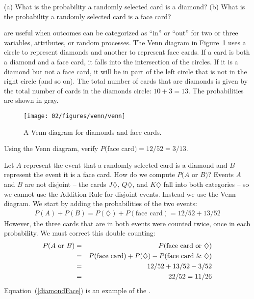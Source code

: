 \begin{exercise}
(a) What is the probability a randomly selected card is a diamond? (b) What is the probability a randomly selected card is a face card?
\end{exercise}

 are useful when outcomes can be categorized as ``in'' or ``out'' for two or three variables, attributes, or random processes. The Venn diagram in Figure~\ref{venn} uses a circle to represent diamonds and another to represent face cards. If a card is both a diamond and a face card, it falls into the intersection of the circles. If it is a diamond but not a face card, it will be in part of the left circle that is not in the right circle (and so on). The total number of cards that are diamonds is given by the total number of cards in the diamonds circle: $10+3=13$. The probabilities are shown in \color{gray}gray\color{black}. 
\begin{figure}
\centering
\texttt{[image: 02/figures/venn/venn]}
\caption{A Venn diagram for diamonds and face cards.}
\label{venn}
\end{figure}

\begin{exercise}
Using the Venn diagram, verify $P($face card$) = 12/52=3/13$.
\end{exercise}

Let $A$ represent the event that a randomly selected card is a diamond and $B$ represent the event it is a face card. How do we compute $P(A$ or $B)$? Events $A$ and $B$ are not disjoint -- the cards $J\diamondsuit$, $Q\diamondsuit$, and $K\diamondsuit$ fall into both categories -- so we cannot use the Addition Rule for disjoint events. Instead we use the Venn diagram. We start by adding the probabilities of the two events:
\begin{eqnarray*}
P(A) + P(B) = P(\diamondsuit) + P(\text{face card}) = 12/52 + 13/52
\label{overCountFaceDiamond}
\end{eqnarray*}
However, the three cards that are in both events were counted twice, once in each probability. We must correct this double counting:
\begin{eqnarray}
P(A\text{ or } B) &=&P(\text{face card or }\diamondsuit)  \notag \\
 &=& P(\text{face card}) + P(\diamondsuit) - P(\text{face card \& }\diamondsuit) \label{diamondFace} \\
 &=& 12/52 + 13/52 - 3/52 \notag \\
 &=& 22/52 = 11/26 \notag
\end{eqnarray}
Equation~(\ref{diamondFace}) is an example of the . 

